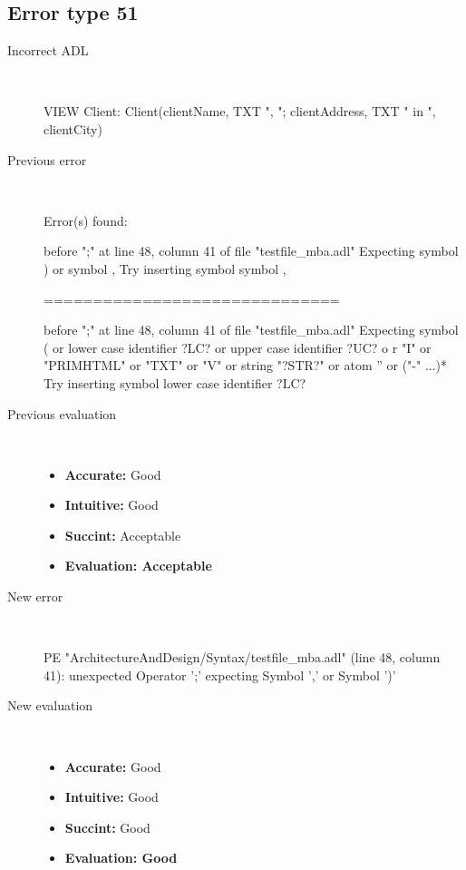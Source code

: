 \hrulefill

\subsection{Error type 51}
  \begin{description}
  \item[Incorrect ADL]~\\
\begin{adl}
VIEW Client: Client(clientName, TXT ", "; clientAddress, TXT " in ", clientCity)\end{adl}
  \item[Previous error]~\\
\begin{haskell}
Error(s) found:

before ";" at line 48, column 41 of file "testfile_mba.adl"
Expecting symbol ) or symbol ,
Try inserting symbol symbol ,

==============================

before ";" at line 48, column 41 of file "testfile_mba.adl"
Expecting symbol ( or lower case identifier ?LC? or upper case identifier ?UC? o
r "I" or "PRIMHTML" or "TXT" or "V" or string "?STR?" or atom '' or ("-" ...)*
Try inserting symbol lower case identifier ?LC?
\end{haskell}
  \item[Previous evaluation]~\\
    \begin{itemize}
    \item \textbf{Accurate:} Good
    \item \textbf{Intuitive:} Good
    \item \textbf{Succint:} Acceptable
    \item \textbf{Evaluation: Acceptable}
    \end{itemize}
  \item[New error]~\\
\begin{haskell}
PE "ArchitectureAndDesign/Syntax/testfile_mba.adl" (line 48, column 41):
unexpected Operator ';'
expecting Symbol ',' or Symbol ')'\end{haskell}
  \item[New evaluation]~\\
    \begin{itemize}
    \item \textbf{Accurate:} Good
    \item \textbf{Intuitive:} Good
    \item \textbf{Succint:} Good
    \item \textbf{Evaluation: Good
}
    \end{itemize}
  \end{description}

